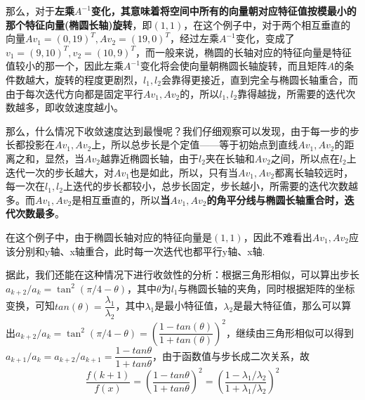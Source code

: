 那么，对于\textbf{左乘$A^{-1}$变化，其意味着将空间中所有的向量朝对应特征值按模最小的那个特征向量(椭圆长轴)旋转}，即$(1,1)$，在这个例子中，对于两个相互垂直的向量$Av_1=(0,19)^T,Av_2=(19,0)^T$，经过左乘$A^{-1}$变化，变成了$v_1=(9,10)^T,v_2=(10,9)^T$，而一般来说，椭圆的长轴对应的特征向量是特征值较小的那一个，因此左乘$A^{-1}$变化将会使向量朝椭圆长轴旋转，而且矩阵$A$的条件数越大，旋转的程度更剧烈，$l_1,l_2$会靠得更接近，直到完全与椭圆长轴重合，而由于每次迭代方向都是固定平行$Av_1,Av_2$的，所以$l_1,l_2$靠得越拢，所需要的迭代次数越多，即收敛速度越小。

那么，什么情况下收敛速度达到最慢呢？我们仔细观察可以发现，由于每一步的步长都投影在$Av_1,Av_2$上，所以总步长是个定值——等于初始点到直线$Av_1,Av_2$的距离之和，显然，当$Av_2$越靠近椭圆长轴，由于$l_2$夹在长轴和$Av_2$之间，所以点在$l_2$上迭代一次的步长越大，对$Av_1$也是如此，所以，只有当$Av_1,Av_2$都离长轴较远时，每一次在$l_1,l_2$上迭代的步长都较小，总步长固定，步长越小，所需要的迭代次数越多。而$Av_1,Av_2$是相互垂直的，所以\textbf{当$Av_1,Av_2$的角平分线与椭圆长轴重合时，迭代次数最多}。

在这个例子中，由于椭圆长轴对应的特征向量是$(1,1)$，因此不难看出$Av_1,Av_2$应该分别和y轴、x轴重合，此时每一次迭代也都平行y轴、x轴.

据此，我们还能在这种情况下进行收敛性的分析：根据三角形相似，可以算出步长$a_{k+2}/a_k=\tan^2(\pi/4-\theta)$，其中$\theta$为$l_1$与椭圆长轴的夹角，同时根据矩阵的坐标变换，可知$tan(\theta)=\dfrac{\lambda_1}{\lambda_2}$，其中$\lambda_1$是最小特征值，$\lambda_2$是最大特征值，那么可以算出$a_{k+2}/a_k=\tan^2(\pi/4-\theta)=(\dfrac{1-tan(\theta)}{1+tan(\theta)})^2$，继续由三角形相似可以得到$a_{k+1}/a_k=a_{k+2}/a_{k+1}=\dfrac{1-tan\theta}{1+tan\theta}$，由于函数值与步长成二次关系，故\[\dfrac{f(k+1)}{f(x)}=(\dfrac{1-tan\theta}{1+tan\theta})^2=(\dfrac{1-\lambda_1/\lambda_2}{1+\lambda_1/\lambda_2})^2\]



